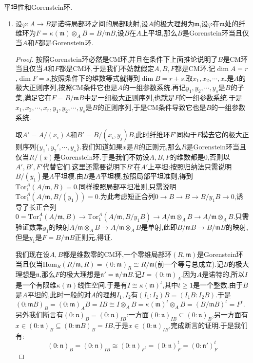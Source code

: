平坦性和Gorenstein环.
\begin{enumerate}
	\item 设$\varphi:A\to B$是诺特局部环之间的局部映射,设$A$的极大理想为$\mathfrak{m}$,设$\varphi$在$\mathfrak{m}$处的纤维环为$F=\kappa(\mathfrak{m})\otimes_AB=B/\mathfrak{m}B$,设$B$在$A$上平坦,那么$B$是Gorenstein环当且仅当$A$和$F$都是Gorenstein环.
	\begin{proof}
		
		按照Gorenstein环必然是CM环,并且在条件下上面推论说明了$B$是CM环当且仅当$A$和$F$都是CM环,于是我们不妨就假定$A,B,F$都是CM环.记$\dim A=r$,$\dim F=s$,按照条件下的维数等式就得到$\dim B=r+s$.取$x_1,x_2,\cdots,x_r$是$A$的极大正则序列,按照CM条件它也是$A$的一组参数系统.再记$y_1,y_2,\cdots,y_s$是$B$的子集,满足它在$F=B/\mathfrak{m}B$中是一组极大正则序列,也就是$F$的一组参数系统.于是$x_1,x_2,\cdots,x_r,y_1,y_2,\cdots,y_s$是$B$的正则序列,于是CM条件导致它也是$B$的一组参数系统.
		
		\qquad
		
		取$A'=A/(x_i)A$和$B'=B/(x_i,y_j)B$,此时纤维环$F'$同构于$F$模去它的极大正则序列$\{y_1',y_2',\cdots,y_s\}$.我们知道如果$x$是$R$的正则元,那么$R$是Gorenstein环当且仅当$R/(x)$是Gorenstein环.于是我们不妨设$A,B,F$的维数都是0,否则以$A',B',F'$代替它们.这里还需要说明下$B'$在$A'$上平坦:按照归纳法只需说明$B/(y_1)$是$A$平坦模.由$B$是$A$平坦模,按照局部平坦准则,得到$\mathrm{Tor}_1^A(A/\mathfrak{m},B)=0$.同样按照局部平坦准则,只需说明$\mathrm{Tor}_1^A(A/\mathfrak{m},B/(y_1))=0$.为此考虑短正合列$0\to B\to B\to B/y_1B\to0$,诱导了长正合列$0=\mathrm{Tor}_1^A(A/\mathfrak{m},B)\to\mathrm{Tor}_1^A(A/\mathfrak{m},B/y_1B)\to A/\mathfrak{m}\otimes_AB\to A/\mathfrak{m}\otimes_AB$.只需验证数乘$y_1$的映射$A/\mathfrak{m}\otimes_AB\to A/\mathfrak{m}\otimes_AB$是单射,此即$B/\mathfrak{m}B\to B/\mathfrak{m}B$的映射,但是$y_1$是$F=B/\mathfrak{m}B$正则元,得证.
		
		\qquad
		
		我们现在设$A,B$都是维数零的CM环,一个零维局部环$(R,\mathfrak{m})$是Gorenstein环当且仅当$\mathrm{Hom}_R(R/\mathfrak{m},R)=(0:\mathfrak{m})_R\cong R/\mathfrak{m}$(前一个等号总成立).记$B$的极大理想是$\mathfrak{n}$,那么$F$的极大理想是$\mathfrak{n}'=\mathfrak{n}/\mathfrak{m}B$.记$I=(0:\mathfrak{m})_A$.因为$A$是诺特的,所以$I$是一个有限维$\kappa(\mathfrak{m})$线性空间.于是有$I\cong\kappa(\mathfrak{m})^t$,其中$t\ge1$是一个整数.由于$B$是$A$平坦的,此时一般的对$A$的理想$I_1,I_2$有$(I_1:I_2)B=(I_1B:I_2B)$.于是$(0:\mathfrak{m}B)_B=(0:\mathfrak{m})_AB=IB\cong I\otimes_AB=\kappa(\mathfrak{m})^t\otimes_AB=(B/\mathfrak{m}B)^t=F^t$.另外我们断言有$(0:\mathfrak{n})_B=(0:\mathfrak{n})_{IB}$:一方面$(0:\mathfrak{n})_{IB}\subseteq(0:\mathfrak{n})_B$,另一方面有$x\in(0:\mathfrak{n})_B\subseteq(0:\mathfrak{m}B)_B=IB$,于是$x\in(0:\mathfrak{n})_{IB}$,完成断言的证明.于是我们有:
		$$(0:\mathfrak{n})_B=(0:\mathfrak{n})_{IB}\cong(0:\mathfrak{n})_{F^t}=(0:\mathfrak{n})_F^t=(0:\mathfrak{n}')_F^t$$
		

\end{proof}
\end{enumerate}
